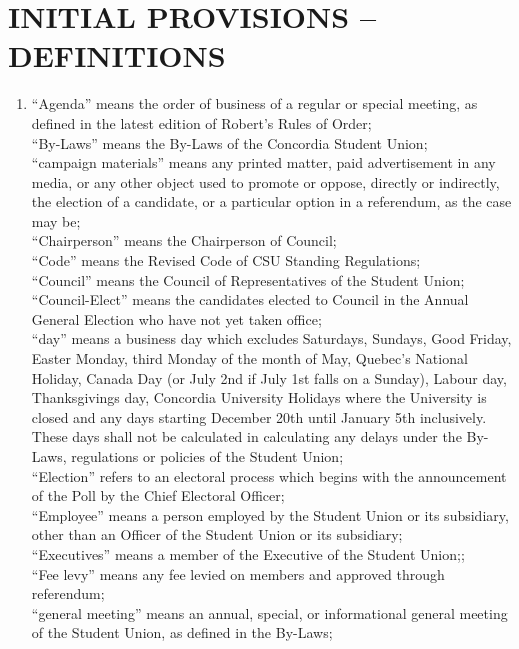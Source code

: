 \documentclass[oneside]{book}
\begin{document}
\part{\label{DEFINITIONS}INITIAL PROVISIONS -- DEFINITIONS}
\begin{enumerate}
\item ``Agenda'' means the order of business of a regular
or special meeting, as defined in the latest edition of Robert's Rules
of Order; \\
 ``By-Laws'' means the By-Laws of the Concordia
Student Union; \\
``campaign materials'' means any printed
matter, paid advertisement in any media, or any other object used
to promote or oppose, directly or indirectly, the election of a candidate,
or a particular option in a referendum, as the case may be; \\
``Chairperson'' means the Chairperson of
Council; \\
``Code'' means the Revised Code of CSU Standing
Regulations; \\
``Council'' means the Council of Representatives
of the Student Union; \\
``Council-Elect'' means the candidates elected
to Council in the Annual General Election who have not yet taken office;
\\
``day'' means a business day which excludes
Saturdays, Sundays, Good Friday, Easter Monday, third Monday of the
month of May, Quebec's National Holiday, Canada Day (or July 2nd if
July 1st falls on a Sunday), Labour day, Thanksgivings day, Concordia
University Holidays where the University is closed and any days starting
December 20th until January 5th inclusively. These days shall not
be calculated in calculating any delays under the By-Laws, regulations
or policies of the Student Union; \\
``Election'' refers to an electoral process
which begins with the announcement of the Poll by the Chief Electoral
Officer; \\
``Employee'' means a person employed by
the Student Union or its subsidiary, other than an Officer of the
Student Union or its subsidiary; \\
``Executives'' means a member of the Executive
of the Student Union;; \\
``Fee levy'' means any fee levied on members
and approved through referendum; \\
``general meeting'' means an annual, special,
or informational general meeting of the Student Union, as defined
in the By-Laws; \\

\end{enumerate}
\end{document}
